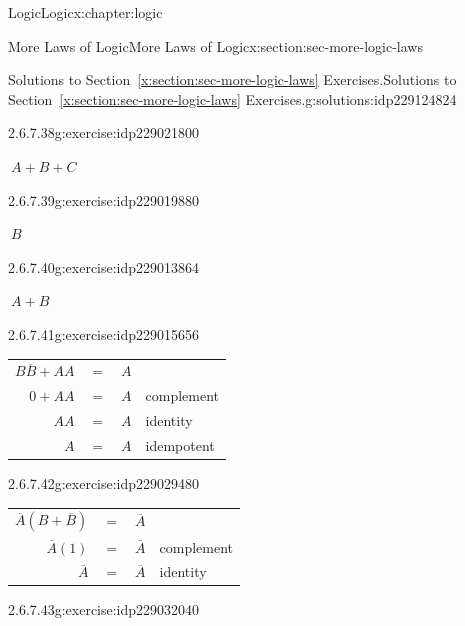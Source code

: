 \documentclass[twoside,10pt,]{book}
\newcommand{\tabularfont}{\relax}
\newcommand{\xreffont}{\relax}
\numberwithin{equation}{section}
\begin{document}
\begin{chapterptx}{Logic}{}{Logic}{}{}{x:chapter:logic}
\begin{sectionptx}{More Laws of Logic}{}{More Laws of Logic}{}{}{x:section:sec-more-logic-laws}
\begin{solutions-subsection}{Solutions to Section~{\xreffont\ref*{x:section:sec-more-logic-laws}} Exercises.}{}{Solutions to Section~{\xreffont\ref*{x:section:sec-more-logic-laws}} Exercises.}{}{}{g:solutions:idp229124824}
\begin{exercisegroup}
\begin{divisionsolutioneg}{2.6.7.38}{}{g:exercise:idp229021800}
\par\smallskip%
\noindent\hypertarget{g:solution:idp229021928-main}{}\(\ A+B+C\)\end{divisionsolutioneg}%
\begin{divisionsolutioneg}{2.6.7.39}{}{g:exercise:idp229019880}%
\par\smallskip%
\noindent\hypertarget{g:solution:idp229021032-main}{}\(\ B\)\end{divisionsolutioneg}%
\begin{divisionsolutioneg}{2.6.7.40}{}{g:exercise:idp229013864}%
\par\smallskip%
\noindent\hypertarget{g:solution:idp229017320-main}{}\(\ A+B\)\end{divisionsolutioneg}%
\end{exercisegroup}
\par\medskip\noindent
\begin{exercisegroup}
\begin{divisionsolutioneg}{2.6.7.41}{}{g:exercise:idp229015656}%
\par\smallskip%
\noindent\hypertarget{g:solution:idp229014248-main}{}\begin{center}%
{\tabularfont%
\begin{tabular}{llll}
\multicolumn{1}{r}{\(B\overline{B}{}+AA\)}&\(=\)&\(A\)&\(\)\tabularnewline[0pt]
\multicolumn{1}{r}{\(0+AA\)}&\(=\)&\(A\)&complement\tabularnewline[0pt]
\multicolumn{1}{r}{\(AA\)}&\(=\)&\(A\)&identity\tabularnewline[0pt]
\multicolumn{1}{r}{\(A\)}&\(=\)&\(A\)&idempotent
\end{tabular}
}%
\end{center}%
\end{divisionsolutioneg}%
\begin{divisionsolutioneg}{2.6.7.42}{}{g:exercise:idp229029480}%
\par\smallskip%
\noindent\hypertarget{g:solution:idp229022312-main}{}\begin{center}%
{\tabularfont%
\begin{tabular}{llll}
\multicolumn{1}{r}{\(\overline{A}{}(B+\overline{B}{})\)}&\(=\)&\(\overline{A}{}\)&\tabularnewline[0pt]
\multicolumn{1}{r}{\(\overline{A}{}(1)\)}&\(=\)&\(\overline{A}{}\)&complement\tabularnewline[0pt]
\multicolumn{1}{r}{\(\overline{A}{}\)}&\(=\)&\(\overline{A}{}\)&identity
\end{tabular}
}%
\end{center}%
\end{divisionsolutioneg}%
\begin{divisionsolutioneg}{2.6.7.43}{}{g:exercise:idp229032040}%

\end{divisionsolutioneg}
\end{exercisegroup}
\end{solutions-subsection}
\end{sectionptx}
\end{chapterptx}
\end{document}
